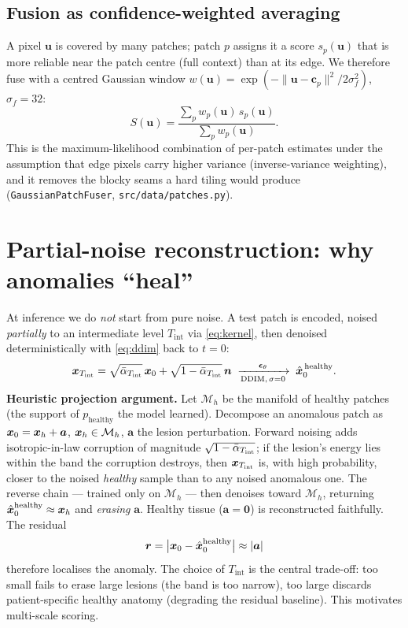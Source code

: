\subsection{Fusion as confidence-weighted averaging}
A pixel $\bm u$ is covered by many patches; patch $p$ assigns it a score
$s_p(\bm u)$ that is more reliable near the patch centre (full context) than at
its edge. We therefore fuse with a centred Gaussian window
$w(\bm u)=\exp(-\|\bm u-\bm c_p\|^2/2\sigma_f^2)$, $\sigma_f=32$:
\begin{equation}
S(\bm u)=\frac{\sum_{p}w_p(\bm u)\,s_p(\bm u)}{\sum_{p}w_p(\bm u)}.
\label{eq:fusion}
\end{equation}
This is the maximum-likelihood combination of per-patch estimates under the
assumption that edge pixels carry higher variance (inverse-variance weighting),
and it removes the blocky seams a hard tiling would produce
(\texttt{GaussianPatchFuser}, \texttt{src/data/patches.py}).

\section{Partial-noise reconstruction: why anomalies ``heal''}
\label{sec:partial}
At inference we do \emph{not} start from pure noise. A test patch is encoded,
noised \emph{partially} to an intermediate level $T_{\text{int}}$ via
\eqref{eq:kernel}, then denoised deterministically with \eqref{eq:ddim} back to
$t=0$:
\begin{equation}
\bm{x}_{T_{\text{int}}}=\sqrt{\bar{\alpha}_{T_{\text{int}}}}\,\bm{x}_0+\sqrt{1-\bar{\alpha}_{T_{\text{int}}}}\,\bm n
\;\xrightarrow[\text{DDIM},\,\sigma=0]{\;\bm{\epsilon}_\theta\;}\;\hat{\bm{x}}_0^{\,\text{healthy}}.
\end{equation}
\textbf{Heuristic projection argument.} Let $\mathcal M_h$ be the manifold of
healthy patches (the support of $p_{\text{healthy}}$ the model learned). Decompose
an anomalous patch as $\bm{x}_0=\bm{x}_h+\bm a$, $\bm{x}_h\in\mathcal M_h$, $\bm a$ the lesion
perturbation. Forward noising adds isotropic-in-law corruption of magnitude
$\sqrt{1-\bar{\alpha}_{T_{\text{int}}}}$; if the lesion's energy lies within the band the
corruption destroys, then $\bm{x}_{T_{\text{int}}}$ is, with high probability, closer to
the noised \emph{healthy} sample than to any noised anomalous one. The reverse
chain --- trained only on $\mathcal M_h$ --- then denoises toward $\mathcal M_h$,
returning $\hat{\bm{x}}_0^{\text{healthy}}\approx\bm{x}_h$ and \emph{erasing} $\bm a$.
Healthy tissue ($\bm a=\bm 0$) is reconstructed faithfully. The residual
\begin{equation}
\bm r=\big|\bm{x}_0-\hat{\bm{x}}_0^{\text{healthy}}\big|\approx|\bm a|
\end{equation}
therefore localises the anomaly. The choice of $T_{\text{int}}$ is the central
trade-off: too small fails to erase large lesions (the band is too narrow), too
large discards patient-specific healthy anatomy (degrading the residual
baseline). This motivates multi-scale scoring.

